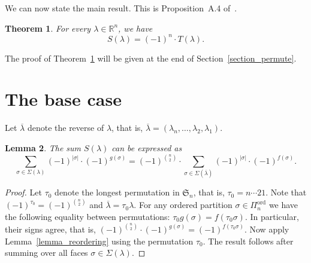\documentclass[10pt]{amsart}
\newtheorem{theorem}{Theorem}[section]
\newtheorem{lemma}[theorem]{Lemma}
\theoremstyle{definition}
\newcommand{\Rrr}{\mathbb{R}}
\newcommand{\Sym}{\mathfrak{S}}
\DeclareMathOperator{\ord}{ord}
\newcommand{\Qn}{\Pi^{\ord}_{n}}
\begin{document}
We can now state the main result.
This
is Proposition~A.4 of~\cite{Morel}.
\begin{theorem}
For every $\lambda \in \Rrr^{n}$, we have
\[S(\lambda)=(-1)^{n} \cdot T(\lambda) . \]
\label{theorem_S_equal_T}
\end{theorem}
The proof of Theorem~\ref{theorem_S_equal_T} will
be given
at the end of Section~\ref{section_permute}.

\section{The base case}
\label{section_base_case}

Let $\overline{\lambda}$ denote the
reverse of $\lambda$, that is,
$\overline{\lambda} = (\lambda_{n}, \ldots, \lambda_{2}, \lambda_{1})$.
\begin{lemma}
The sum $S(\lambda)$ can be expressed as
$$
\sum_{\sigma \in \Sigma(\lambda)}
(-1)^{|\sigma|} \cdot (-1)^{g(\sigma)} 
=
(-1)^{\binom{n}{2}}
\cdot
\sum_{\sigma \in \Sigma(\overline{\lambda})}
(-1)^{|\sigma|} \cdot (-1)^{f(\sigma)} . 
$$
\label{lemma_reverse}
\end{lemma}
\begin{proof}
Let $\tau_{0}$ denote the longest permutation
in $\Sym_{n}$,
that is,
$\tau_{0} = n \cdots 21$.
Note that $(-1)^{\tau_{0}} = (-1)^{\binom{n}{2}}$
and $\overline{\lambda} = \tau_{0} \lambda$.
For any ordered partition $\sigma \in \Qn$ 
we have the
following equality between permutations:
$\tau_{0} g(\sigma) = f(\tau_{0} \sigma)$.
In particular, their signs agree, that is,
$(-1)^{\binom{n}{2}} \cdot (-1)^{g(\sigma)}
= 
(-1)^{f(\tau_{0} \sigma)}$.
Now apply Lemma~\ref{lemma_reordering}
using the permutation $\tau_{0}$.
The result follows after summing over all faces
$\sigma \in \Sigma(\lambda)$.
\end{proof}
\end{document}
